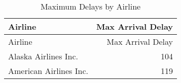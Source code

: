 \documentclass{article}
\begin{document}
\begin{longtable}[]{@{}lr@{}}
  \caption{\label{tab:maxdelays}Maximum Delays by Airline}\tabularnewline
  \toprule
  Airline & Max Arrival Delay \\
  \midrule
  \endfirsthead
  \toprule
  Airline & Max Arrival Delay \\
  \midrule
  \endhead
  Alaska Airlines Inc. & 104 \\
  American Airlines Inc. & 119 \\
  \bottomrule
\end{longtable}
\end{document}
